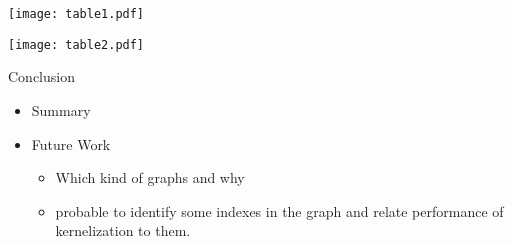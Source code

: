 \documentclass{beamer}
\begin{document}
\begin{comment}
\begin{frame}[fragile]{AMPL Model for vertex cover restricted to maximal cliques}


\begin{verbatim}
# Declarations
set V;
set E within V cross V;
set Idx;
set Q within Idx cross V;
set cnt within Idx cross V;
var x {v in V} binary;
# integrality constraints.
# Objective Function
minimize cover_size: sum { v in V } x[v];
# Constraints
subject to clique {c in Idx}:
sum {(a, b) in Q: a=c} x[b] >= card{(a,b) in Q: a=c}-1;
\end{verbatim}

\end{frame}
\end{comment}

\begin{frame}
\begin{center}

\texttt{[image: table1.pdf]}

\end{center}
\end{frame}
\begin{frame}
\begin{center}

\texttt{[image: table2.pdf]}

\end{center}
\end{frame}

\begin{frame}{Conclusion}
\begin{itemize}
\item Summary
\pause
\item Future Work
\pause
\begin{itemize}
\item Which kind of graphs and why
\pause
\item probable to identify some indexes in the graph and relate performance of kernelization to them.
\end{itemize}
\end{itemize}

\end{frame}
\end{document}
